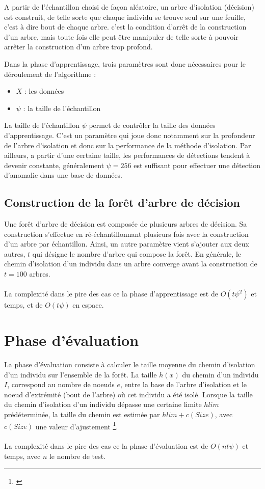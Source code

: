 A partir de l'échantillon choisi de façon aléatoire, un arbre d'isolation (décision) est construit, de telle sorte que chaque individu se trouve seul sur une feuille, c'est à dire bout de chaque arbre. c'est la condition d'arrêt de la construction d'un arbre, mais toute fois elle peut être manipuler de telle sorte à pouvoir arrêter la construction d'un arbre trop profond.

Dans la phase d'apprentissage, trois paramètres sont donc nécessaires pour le déroulement de l'algorithme : 

\begin{itemize}
    \item $X$ : les données
    \item $\psi$ : la taille de l'échantillon
\end{itemize}

La taille de l'échantillon $\psi$ permet de contrôler la taille des données d'apprentissage. C'est un paramètre qui joue donc notamment sur la profondeur de l'arbre d'isolation et donc sur la performance de la méthode d'isolation. Par ailleurs, a partir d'une certaine taille, les performances de détections tendent à devenir constante, généralement $\psi=256$ est suffisant pour effectuer une détection d'anomalie dans une base de données.

\subsection*{Construction de la forêt d'arbre de décision}
Une forêt d'arbre de décision est composée de plusieurs arbres de décision. Sa construction s'effectue en ré-échantillonnant plusieurs fois avec la construction d'un arbre par échantillon. Ainsi, un autre paramètre vient s'ajouter aux deux autres, $t$ qui désigne le nombre d'arbre qui compose la forêt. En générale, le chemin d'isolation d'un individu dans un arbre converge avant la construction de $t=100$ arbres.
\\
\\
La complexité dans le pire des cas ce la phase d'apprentissage est de $O(t\psi^2)$ et temps, et de $O(t\psi)$ en espace.

\section{Phase d'évaluation}
La phase d'évaluation consiste à calculer le taille moyenne du chemin d'isolation d'un individu sur l'ensemble de la forêt.
La taille $h(x)$ du chemin d'un individu $I$, correspond au nombre de noeuds $e$, entre la base de l'arbre d'isolation et le noeud d'extrémité (bout de l'arbre) où cet individu a été isolé. 
Lorsque la taille du chemin d'isolation d'un individu dépasse une certaine limite $hlim$ prédéterminée, la taille du chemin est estimée par $hlim+c(Size)$, avec $c(Size)$ une valeur d'ajustement \footnote{\cite{Liu2012}}.
\\
\\
La complexité dans le pire des cas ce la phase d'évaluation est de $O(nt\psi)$ et temps, avec $n$ le nombre de test.

